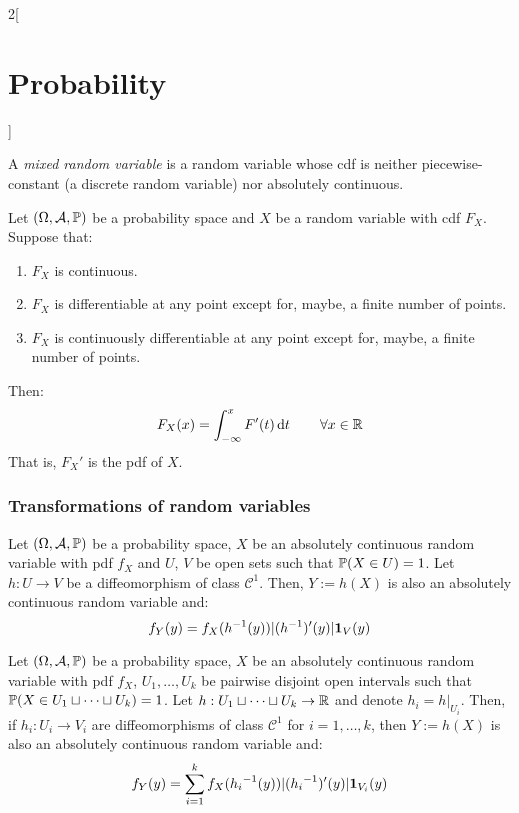 \documentclass[../../../main_math.tex]{subfiles}
\begin{document}
\begin{multicols}{2}[\section{Probability}]
\begin{definition}
  \end{definition}
  \begin{definition}
    A \emph{mixed random variable} is a random variable whose cdf is neither piecewise-constant (a discrete random variable) nor absolutely  continuous.
  \end{definition}
  \begin{theorem}
    Let $(\Omega,\mathcal{A},\mathbb{P})$ be a probability space and $X$ be a random variable with cdf $F_X$. Suppose that:
    \begin{enumerate}
      \item $F_X$ is continuous.
      \item $F_X$ is differentiable at any point except for, maybe, a finite number of points.
      \item $F_X$ is continuously differentiable at any point except for, maybe, a finite number of points.
    \end{enumerate}
    Then: $$F_X(x)=\int_{-\infty}^xF'(t)\dd{t}\qquad\forall x\in\mathbb{R}$$
    That is, ${F_X}'$ is the pdf of $X$.
  \end{theorem}
  \subsubsection{Transformations of random variables}
  \begin{proposition}
    Let $(\Omega,\mathcal{A},\mathbb{P})$ be a probability space, $X$ be an absolutely continuous random variable with pdf $f_X$ and $U$, $V$ be open sets such that $\mathbb{P}(X\in U)=1$. Let $h:U\rightarrow V$ be a diffeomorphism of class $\mathcal{C}^1$. Then, $Y:=h(X)$ is also an absolutely continuous random variable and: $$f_Y(y)=f_X(h^{-1}(y))|(h^{-1})'(y)|\boldsymbol{\mathrm{1}}_{V}(y)$$
  \end{proposition}
  \begin{proposition}
    Let $(\Omega,\mathcal{A},\mathbb{P})$ be a probability space, $X$ be an absolutely continuous random variable with pdf $f_X$, $U_1,\ldots, U_k$ be pairwise disjoint open intervals such that $\mathbb{P}(X\in U_1\sqcup \cdots\sqcup U_k)=1$. Let $h:U_1\sqcup \cdots\sqcup U_k\rightarrow \mathbb{R}$ and denote $h_i=h|_{U_i}$. Then, if $h_i:U_i\rightarrow V_i$ are  diffeomorphisms of class $\mathcal{C}^1$ for $i=1,\ldots,k$, then $Y:=h(X)$ is also an absolutely continuous random variable and: $$f_Y(y)=\sum_{i=1}^kf_X({h_i}^{-1}(y))|({h_i}^{-1})'(y)|\boldsymbol{\mathrm{1}}_{V_i}(y)$$
  \end{proposition}

\end{multicols}
\end{document}
